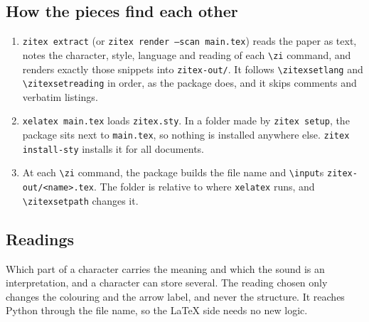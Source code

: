 \documentclass[11pt]{article}
\newcommand{\cmd}[1]{\texttt{\textbackslash #1}}               %
\begin{document}
\subsection{How the pieces find each other}
\begin{enumerate}
  \item \texttt{zitex extract} (or \texttt{zitex render --scan main.tex}) reads the paper as text, notes the character, style, language and reading of each \cmd{zi} command, and renders exactly those snippets into \texttt{zitex-out/}. It follows \cmd{zitexsetlang} and \cmd{zitexsetreading} in order, as the package does, and it skips comments and verbatim listings.
  \item \texttt{xelatex main.tex} loads \texttt{zitex.sty}. In a folder made by \texttt{zitex setup}, the package sits next to \texttt{main.tex}, so nothing is installed anywhere else. \texttt{zitex install-sty} installs it for all documents.
  \item At each \cmd{zi} command, the package builds the file name and \cmd{input}s \texttt{zitex-out/<name>.tex}. The folder is relative to where \texttt{xelatex} runs, and \cmd{zitexsetpath} changes it.
\end{enumerate}

\subsection{Readings}
Which part of a character carries the meaning and which the sound is an interpretation, and a character can store several. The reading chosen only changes the colouring and the arrow label, and never the structure. It reaches Python through the file name, so the \LaTeX{} side needs no new logic.
\end{document}
